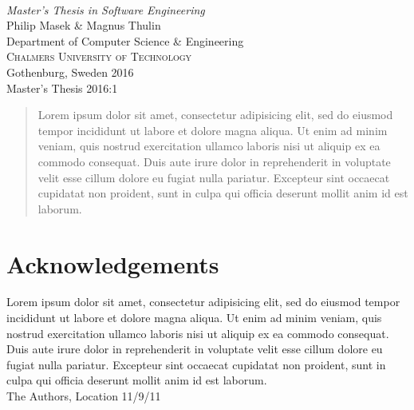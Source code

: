 \begin{titlepage}

\mbox{}
\vfill
\addtolength{\voffset}{2cm}
\begin{flushleft}
	{ \\[0.5cm]
	\emph{\Large Master's Thesis in Software Engineering} \\[.8cm]
	
	{\huge Philip Masek \& Magnus Thulin}\\[.8cm]
	
	{\Large Department of Computer Science \& Engineering \\
	\textsc{Chalmers University of Technology} \\
	Gothenburg, Sweden 2016 \\
	Master's Thesis 2016:1\\
	}
	}
\end{flushleft}

\end{titlepage}
\ClearShipoutPicture

\pagestyle{empty}
\newpage
\clearpage
\thispagestyle{empty}
\phantom{a}
\vfill
{}
\vfill
\mbox{}
\newpage
\clearpage
\thispagestyle{empty}

\begin{abstract}
Lorem ipsum dolor sit amet, consectetur adipisicing elit, sed do eiusmod tempor incididunt ut labore et dolore magna aliqua. Ut enim ad minim veniam, quis nostrud exercitation ullamco laboris nisi ut aliquip ex ea commodo consequat. Duis aute irure dolor in reprehenderit in voluptate velit esse cillum dolore eu fugiat nulla pariatur. Excepteur sint occaecat cupidatat non proident, sunt in culpa qui officia deserunt mollit anim id est laborum.
\end{abstract}

\newpage
\clearpage
\thispagestyle{empty}
\phantom{a}
\vfill
{}
\vfill
\mbox{}
\newpage
\clearpage
\thispagestyle{empty}
\section*{Acknowledgements}
Lorem ipsum dolor sit amet, consectetur adipisicing elit, sed do eiusmod tempor incididunt ut labore et dolore magna aliqua. Ut enim ad minim veniam, quis nostrud exercitation ullamco laboris nisi ut aliquip ex ea commodo consequat. Duis aute irure dolor in reprehenderit in voluptate velit esse cillum dolore eu fugiat nulla pariatur. Excepteur sint occaecat cupidatat non proident, sunt in culpa qui officia deserunt mollit anim id est laborum. \\[1cm]

\hfill The Authors, Location 11/9/11
\newpage
\clearpage
\thispagestyle{empty}
\phantom{a}
\vfill
{}
\vfill
\mbox{}